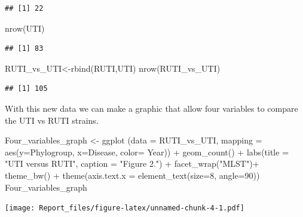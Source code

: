 \documentclass[
]{article}
\newenvironment{Shaded}{\begin{snugshade}}{\end{snugshade}}
\newcommand{\AttributeTok}[1]{\textcolor[rgb]{0.77,0.63,0.00}{#1}}
\newcommand{\DecValTok}[1]{\textcolor[rgb]{0.00,0.00,0.81}{#1}}
\newcommand{\FunctionTok}[1]{\textcolor[rgb]{0.00,0.00,0.00}{#1}}
\newcommand{\NormalTok}[1]{#1}
\newcommand{\OtherTok}[1]{\textcolor[rgb]{0.56,0.35,0.01}{#1}}
\newcommand{\SpecialCharTok}[1]{\textcolor[rgb]{0.00,0.00,0.00}{#1}}
\newcommand{\StringTok}[1]{\textcolor[rgb]{0.31,0.60,0.02}{#1}}
\begin{document}
\begin{verbatim}
## [1] 22
\end{verbatim}

\begin{Shaded}
\begin{Highlighting}[]
\FunctionTok{nrow}\NormalTok{(UTI)}
\end{Highlighting}
\end{Shaded}

\begin{verbatim}
## [1] 83
\end{verbatim}

\begin{Shaded}
\begin{Highlighting}[]
\NormalTok{RUTI\_vs\_UTI}\OtherTok{\textless{}{-}}\FunctionTok{rbind}\NormalTok{(RUTI,UTI)}
\FunctionTok{nrow}\NormalTok{(RUTI\_vs\_UTI)}
\end{Highlighting}
\end{Shaded}

\begin{verbatim}
## [1] 105
\end{verbatim}

With this new data we can make a graphic that allow four variables to
compare the UTI vs RUTI strains.

\begin{Shaded}
\begin{Highlighting}[]
\NormalTok{Four\_variables\_graph }\OtherTok{\textless{}{-}} \FunctionTok{ggplot}\NormalTok{ (}\AttributeTok{data =}\NormalTok{ RUTI\_vs\_UTI, }\AttributeTok{mapping =} \FunctionTok{aes}\NormalTok{(}\AttributeTok{y=}\NormalTok{Phylogroup, }\AttributeTok{x=}\NormalTok{Disease, }\AttributeTok{color=}\NormalTok{ Year)) }\SpecialCharTok{+} \FunctionTok{geom\_count}\NormalTok{() }\SpecialCharTok{+} \FunctionTok{labs}\NormalTok{(}\AttributeTok{title =} \StringTok{"UTI versus RUTI"}\NormalTok{, }\AttributeTok{caption =} \StringTok{"Figure 2."}\NormalTok{) }\SpecialCharTok{+} \FunctionTok{facet\_wrap}\NormalTok{(}\StringTok{"MLST"}\NormalTok{)}\SpecialCharTok{+} \FunctionTok{theme\_bw}\NormalTok{() }\SpecialCharTok{+} \FunctionTok{theme}\NormalTok{(}\AttributeTok{axis.text.x =} \FunctionTok{element\_text}\NormalTok{(}\AttributeTok{size=}\DecValTok{8}\NormalTok{, }\AttributeTok{angle=}\DecValTok{90}\NormalTok{))}
\NormalTok{Four\_variables\_graph}
\end{Highlighting}
\end{Shaded}

\texttt{[image: Report\_files/figure-latex/unnamed-chunk-4-1.pdf]}
\end{document}
